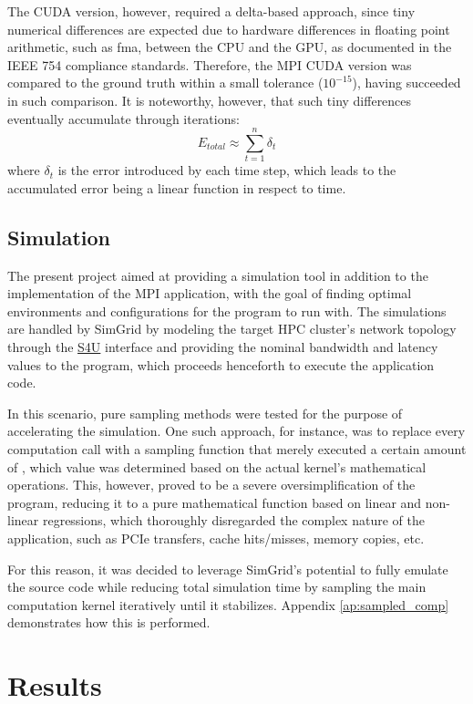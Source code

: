 \documentclass[cic,tc,english]{infufrgs}
\begin{document}
The CUDA version, however, required a delta-based approach, since tiny numerical
differences are expected due to hardware differences in floating
point arithmetic, such as \acrfull{fma},
between the CPU and the GPU, as documented in the IEEE 754 compliance
standards. Therefore, the MPI CUDA version was compared to
the ground truth within a small tolerance ($10^{-15}$), having
succeeded in such comparison. It is noteworthy, however, that such
tiny differences eventually accumulate through iterations:
\begin{equation}
  E_{total} \approx \sum_{t = 1}^{n}{\delta_t}
\end{equation}
where $\delta_t$ is the error introduced by each time step,
which leads to the accumulated error being a linear function in
respect to time.

\section{Simulation}
The present project aimed at providing a simulation tool in addition
to the implementation
of the MPI application, with the goal of finding optimal environments and
configurations for the program to run with.
The simulations are handled by SimGrid \cite{simgrid} by modeling the target
HPC cluster's network topology through the
\href{https://simgrid.org/doc/latest/app_s4u.html}{S4U}
interface and providing the nominal bandwidth and latency values to the
program, which proceeds henceforth to execute the application code.

In this scenario, pure sampling methods were tested for the purpose of
accelerating the simulation. One such approach, for instance, was to
replace every computation call with a sampling function that merely executed
a certain amount of , which value was determined based on
the actual kernel's mathematical operations. This, however, proved to be
a severe oversimplification of the program, reducing it to a pure mathematical
function based on linear and non-linear regressions, which thoroughly
disregarded the complex nature of the application, such as PCIe transfers,
cache hits/misses, memory copies, etc.

For this reason, it was decided to leverage SimGrid's potential to fully emulate
the source code while reducing total simulation time by sampling the
main computation
kernel iteratively until it stabilizes. Appendix
\ref{ap:sampled_comp} demonstrates
how this is performed.

\chapter{Results}
\label{ch:results}
\end{document}
